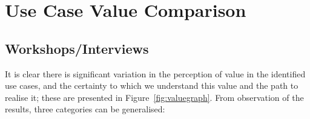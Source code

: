 \documentclass[b5paper,10pt]{article}
\begin{document}

\section{Use Case Value Comparison}\label{usecasecomp}

\subsection{Workshops/Interviews}

It is clear there is significant variation in the perception of value
in the identified use cases, and the certainty to which we understand
this value and the path to realise it; these are presented in
Figure~\ref{fig:valuegraph}. From observation of the results, three
categories can be generalised:
\end{document}
